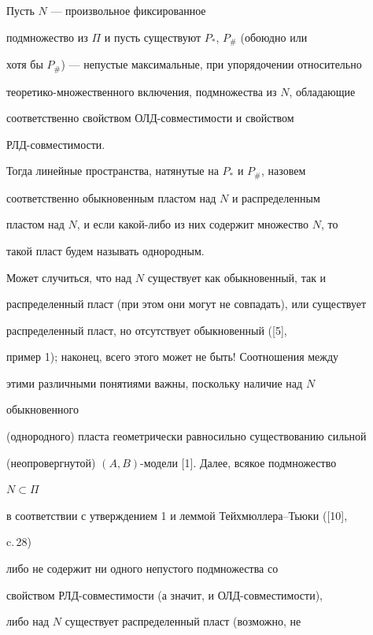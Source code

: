 \begin{defn} 


Пусть $N$ --- произвольное фиксированное 


подмножество из $\Pi$ и пусть существуют $P_*$, $P_{\#}$ (обоюдно или 


хотя бы $P_{\#}$) --- непустые максимальные, при упорядочении относительно 


теоретико-множественного включения, подмножества из $N$, обладающие


соответственно свойством ОЛД-совместимости и свойством 


РЛД-совместимости. 


Тогда линейные пространства, натянутые на $P_*$ и $P_{\#}$, назовем


соответственно обыкновенным пластом над $N$ и распределенным 


пластом над $N$, и если какой-либо из них содержит множество $N$, то 


такой пласт будем называть однородным. 


\end{defn} 


 


Может случиться, что над $N$ существует как обыкновенный, так и 


распределенный пласт (при этом они могут не совпадать), или существует 


распределенный пласт, но отсутствует обыкновенный ([5], 


пример 1); наконец, всего этого может не быть! Соотношения между 


этими различными понятиями важны, поскольку наличие над $N$ 


обыкновенного 


(однородного) пласта геометрически равносильно существованию сильной 


(неопровергнутой) $(A,B)$-модели [1]. Далее, всякое подмножество 


$N\subset\Pi$ 


в соответствии с утверждением 1 и леммой Тейхмюллера--Тьюки ([10], 


c.\,28) 


либо не содержит ни одного непустого подмножества со 


свойством РЛД-совместимости (а значит, и ОЛД-совместимости), 


либо над $N$ существует распределенный пласт (возможно, не 


